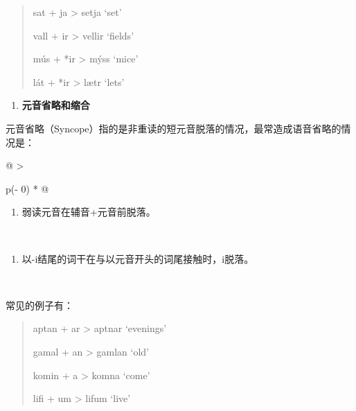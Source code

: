 \begin{quote}
  sat + ja \textgreater{} setja `set'

  vall + ir \textgreater{} vellir `fields'

  mús + *ir \textgreater{} mýss `mice'

  lát + *ir \textgreater{} lætr `lets'
\end{quote}

\begin{enumerate}
  \def\labelenumi{\Alph{enumi}.}
  \setcounter{enumi}{1}
  \item
        \label{_Ref115693879}{}\textbf{元音省略和缩合}
\end{enumerate}

元音省略（Syncope）指的是非重读的短元音脱落的情况，最常造成语音省略的情况是：

\begin{longtable}[]{@{}
  >{\raggedright\arraybackslash}p{(\columnwidth - 0\tabcolsep) * }@{}}
  \toprule\noalign{}
  \begin{minipage}[b]{\linewidth}\raggedright
    \begin{enumerate}
      \def\labelenumi{\arabic{enumi}.}
      \item
            \label{_Ref115694569}{}弱读元音在辅音+元音前脱落。
    \end{enumerate}
  \end{minipage} \\
  \midrule\noalign{}
  \endhead
  \bottomrule\noalign{}
  \endlastfoot
  \begin{minipage}[t]{\linewidth}\raggedright
    \begin{enumerate}
      \def\labelenumi{\arabic{enumi}.}
      \setcounter{enumi}{1}
      \item
            \label{_Ref115709879}{}以-i结尾的词干在与以元音开头的词尾接触时，i脱落。
    \end{enumerate}
  \end{minipage} \\
\end{longtable}

常见的例子有：

\begin{quote}
  aptan + ar \textgreater{} aptnar `evenings'

  gamal + an \textgreater{} gamlan `old'

  komin + a \textgreater{} komna `come'

  lifi + um \textgreater{} lifum `live'
\end{quote}

